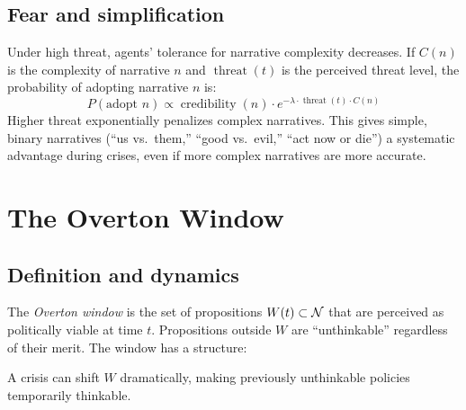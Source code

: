 \subsection{Fear and simplification}

\begin{proposition}
\label{prop:fear-complexity}
Under high threat, agents' tolerance for narrative complexity decreases.
If $C(n)$ is the complexity of narrative $n$ and $\operatorname{threat}(t)$ is the perceived threat level, the probability of adopting narrative $n$ is:
\[
  P(\text{adopt } n) \propto \operatorname{credibility}(n) \cdot e^{-\lambda \cdot \operatorname{threat}(t) \cdot C(n)}
\]
Higher threat exponentially penalizes complex narratives.
This gives simple, binary narratives (``us vs.\ them,'' ``good vs.\ evil,'' ``act now or die'') a systematic advantage during crises, even if more complex narratives are more accurate.
\end{proposition}

\section{The Overton Window}
\label{sec:ch29-overton}

\subsection{Definition and dynamics}

\begin{definition}
\label{def:overton}
The \emph{Overton window} is the set of propositions $W(t) \subset \mathcal{N}$ that are perceived as politically viable at time $t$.
Propositions outside $W$ are ``unthinkable'' regardless of their merit.
The window has a structure:
\begin{center}
\end{center}
A crisis can shift $W$ dramatically, making previously unthinkable policies temporarily thinkable.
\end{definition}


